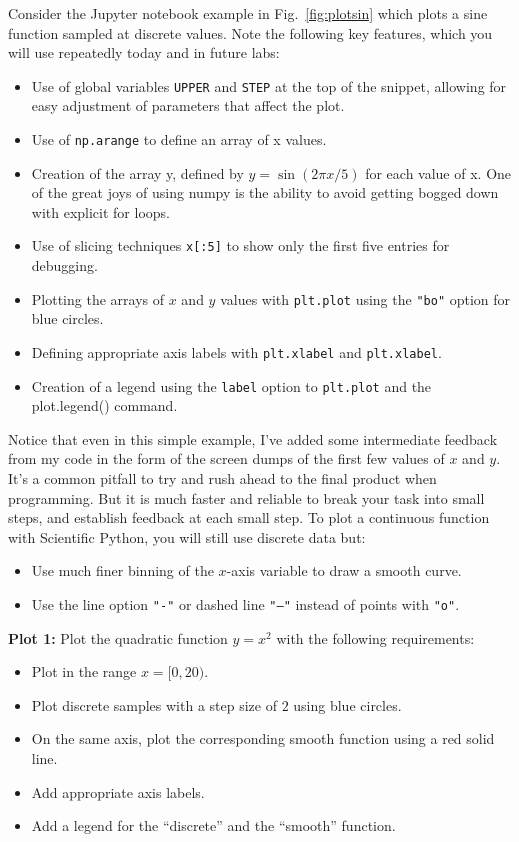 Consider the Jupyter notebook example in Fig.~\ref{fig:plotsin} which plots a sine function sampled at discrete values.  Note the following key features, which you will use repeatedly today and in future labs:
\begin{itemize}
\item Use of global variables {\tt UPPER} and {\tt STEP} at the top of the snippet, allowing for easy adjustment of parameters that affect the plot.
\item Use of {\tt np.arange} to define an array of x values.
\item Creation of the array y, defined by $y = \sin(2\pi x / 5)$ for each value of x.  One of the great joys of using numpy is the ability to avoid getting bogged down with explicit for loops.
\item Use of slicing techniques {\tt x[:5]} to show only the first five entries for debugging.  
\item Plotting the arrays of $x$ and $y$ values with {\tt plt.plot}  using the {\tt "bo"} option for blue circles.
\item Defining appropriate axis labels with {\tt plt.xlabel} and {\tt plt.xlabel}. 
\item Creation of a legend using the {\tt label} option to {\tt plt.plot} and the {plot.legend()} command.
\end{itemize}
Notice that even in this simple example, I've added some intermediate feedback from my code in the form of the screen dumps of the first few values of $x$ and $y$.  It's a common pitfall to try and rush ahead to the final product when programming.  But it is much faster and reliable to break your task into small steps, and establish feedback at each small step. 
	To plot a continuous function with Scientific Python, you will still use discrete data but:
\begin{itemize}
 \item Use much finer binning of the $x$-axis variable to draw a smooth curve. 
 \item Use the line option {\tt "-"} or dashed line {\tt "--"} instead of points with {\tt "o"}. 
\end{itemize} 

\noindent
{\bf Plot 1:}  Plot the quadratic function $y = x^2$ with the following requirements:
\begin{itemize}
 \item Plot in the range $x = [0,20)$.
 \item Plot discrete samples with a step size of $2$ using blue circles.
 \item On the same axis, plot the corresponding smooth function using a red solid line.
 \item Add appropriate axis labels. 
 \item Add a legend for the ``discrete'' and the ``smooth''  function.
\end{itemize}

